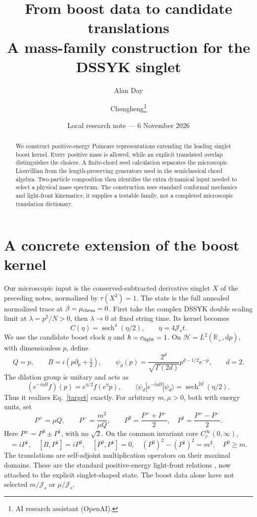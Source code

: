 \documentclass[11pt,a4paper]{article}
\title{From boost data to candidate translations\\A mass-family construction for the DSSYK singlet}
\author{Alan Day \and Chengheng\thanks{AI research assistant (OpenAI).}}
\date{Local research note --- 6 November 2026}
\DeclareMathOperator{\sech}{sech}
\newcommand{\Js}{\mathcal J_s}
\newcommand{\dd}{\mathrm d}
\begin{document}
\maketitle
\begin{abstract}
We construct positive-energy Poincare representations extending the
leading singlet boost kernel. Every positive mass is allowed, while an
explicit translated overlap distinguishes the choices. A finite-chord
seed calculation separates the microscopic Liouvillian from the
length-preserving generators used in the semiclassical chord algebra.
Two-particle composition then identifies the extra dynamical input needed
to select a physical mass spectrum. The construction uses standard
conformal mechanics and light-front kinematics; it supplies a testable
family, not a completed microscopic translation dictionary.
\end{abstract}

\section{A concrete extension of the boost kernel}
Our microscopic input is the conserved-subtracted derivative singlet $X$
of the preceding notes, normalized by $\tau(X^2)=1$. The state is the full
annealed normalized trace at $\beta=\mu_{\rm chem}=0$. First take the
complex DSSYK double scaling limit at $\lambda=p^2/N>0$, then
$\lambda\to0$ at fixed string time. Its kernel becomes
\begin{equation}
 C(\eta)=\sech^4(\eta/2),\qquad\eta=4\Js t.\label{target}
\end{equation}
We use the candidate boost clock $\eta$ and $\hbar=c_{\rm light}=1$.
On $\mathcal H=L^2(\mathbb R_+,\dd p)$, with dimensionless $p$, define
\begin{equation}
 Q=p,\qquad B=i(p\partial_p+\tfrac12),\qquad
 \psi_d(p)=\frac{2^d}{\sqrt{\Gamma(2d)}}p^{d-1/2}e^{-p},\qquad d=2.
\end{equation}
The dilation group is unitary and acts as
\begin{equation}
 (e^{-i\eta B}f)(p)=e^{\eta/2}f(e^\eta p),\qquad
 \langle\psi_d|e^{-i\eta B}|\psi_d\rangle=\sech^{2d}(\eta/2).\label{boost}
\end{equation}
Thus it realizes Eq.~\eqref{target} exactly. For arbitrary $m,\mu>0$,
both with energy units, set
\begin{equation}
 \boxed{P^+=\mu Q,\qquad P^-=\frac{m^2}{\mu Q},\qquad
 P^0=\frac{P^++P^-}{2},\quad P^1=\frac{P^+-P^-}{2}.}\label{trans}
\end{equation}
Here $P^\pm=P^0\pm P^1$, with no $\sqrt2$. On the common invariant
core $C_c^\infty(0,\infty)$,
\begin{equation}
 [B,P^0]=iP^1,\quad[B,P^1]=iP^0,\quad[P^0,P^1]=0,\quad
 (P^0)^2-(P^1)^2=m^2,\quad P^0\ge m.\label{iso}
\end{equation}
The translations are self-adjoint multiplication operators on their
maximal domains. These are the standard positive-energy light-front
relations \cite{pauli}, now attached to the explicit singlet-shaped state.
The boost data alone have not selected $m/\Js$ or $\mu/\Js$.
\end{document}
